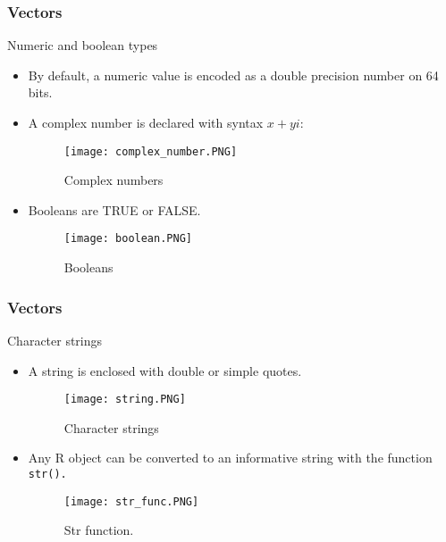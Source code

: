 \begin{frame}
    \frametitle{Vectors}
    \begin{block}{Numeric and boolean types}
        \begin{itemize}
            \item<+-> By default, a numeric value is encoded 
            as a double precision number on 64 bits. 
            \item<+-> A complex number is declared with syntax $x + yi$:
           \begin{figure}[htbp]
            \centering
            \texttt{[image: complex\_number.PNG]}
            \caption{Complex numbers}
            \label{fig:complex_numbers}
           \end{figure}
           \item<+-> Booleans are TRUE or FALSE.
           \begin{figure}[htbp]
            \centering
            \texttt{[image: boolean.PNG]}
            \caption{Booleans}
            \label{fig:booleans}
           \end{figure}
        \end{itemize}
    \end{block}
\end{frame}
\begin{frame}
    \frametitle{Vectors}
    \begin{block}{Character strings}
        \begin{itemize}
           \item<+-> A string is enclosed with double or simple quotes.
           \begin{figure}[htbp]
            \centering
           \texttt{[image: string.PNG]} 
            \caption{Character strings}
            \label{fig:char_strings}
           \end{figure}
           \item<+-> Any R object can be converted to an informative string with the function
           \texttt{str().}
        \begin{figure}[htbp]
            \centering
           \texttt{[image: str\_func.PNG]} 
            \caption{Str function.}
            \label{fig:str_func}
           \end{figure}
        \end{itemize}
    \end{block}
\end{frame}

